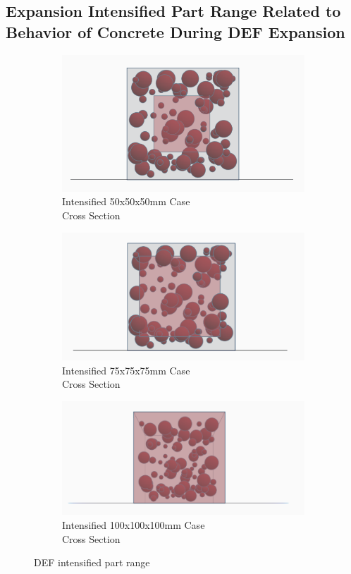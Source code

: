 \clearpage
\subsection{Expansion Intensified Part Range Related to Behavior of Concrete During DEF Expansion}




\begin{figure}[!ht]
\centering
    \begin{subfigure}{.33\textwidth}
      \centering
      \includegraphics[width=.8\linewidth]{Files/DEF_X/X0_3ds.png}
      \caption{Intensified 50x50x50mm Case\\ Cross Section}
    \end{subfigure}%
    \begin{subfigure}{.33\textwidth}
      \centering
      \includegraphics[width=.8\linewidth]{Files/DEF_X/X-5_3ds.png}
      \caption{Intensified 75x75x75mm Case \\ Cross Section}
    \end{subfigure}%
    \begin{subfigure}{.33\textwidth}
      \centering
      \includegraphics[width=.9\linewidth]{Files/DEF_X/X-1_3ds.png}
      \caption{Intensified 100x100x100mm Case\\ Cross Section}
    \end{subfigure}
  \caption{DEF intensified part range}
  \label{fig:DEF_X}
\end{figure}

